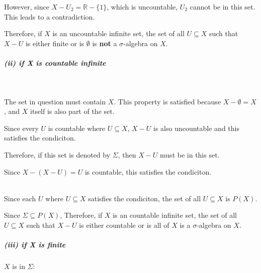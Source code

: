 \documentclass[12pt]{article}
\begin{document}
\par \hspace*{1em}However, since \( X - U_2 = \mathbb{R} - \{1\} \), which is uncountable, \( U_2 \) cannot be in this set. This leads to a contradiction.\\

\par \hspace*{1em}Therefore, if \( X \) is an uncountable infinite set, the set of all \( U \subseteq X \) such that \( X - U \) is either finite or is \(\emptyset\) is \textbf{not}  a \( \sigma \)-algebra on \( X \).\\

\subparagraph{(ii) if X is countable infinite}
\ \\
\par \hspace*{1em}The set in question must contain \(X\). This property is satisfied because \( X - \emptyset = X \), and \( X \) itself is also part of the set. \\
\par \hspace*{1em}Since every \(U\) is countable where \( U \subseteq X \), \(X-U\) is also uncountable and this satisfies the condiciton. \\
\par \hspace*{1em}Therefore, if this set is denoted by \( \Sigma \), then \( X-U \) must be in this set. \\
\par \hspace*{1em}Since \( X - (X-U) = U\) is countable, this satisfies the condiciton. \\ \\

\par \hspace*{1em}Since each \( U \) where \( U \subseteq X \) satisfies the condiciton, the set of all \( U \subseteq X \) is \( P(X) \). \\
\par \hspace*{1em}Since \( \Sigma \subseteq P(X) \), Therefore, if \( X \) is an countable infinite set, the set of all \( U \subseteq X \) such that \( X - U \) is either countable or is all of \(X\) is a \( \sigma \)-algebra on \( X \).
\subparagraph{(iii) if X is finite}

\par \hspace*{1em}$X$ is in $\Sigma$:
\end{document}
